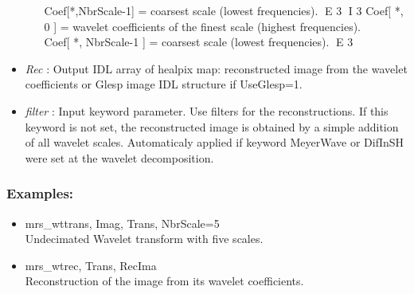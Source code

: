 \begin{itemize}
\begin{itemize}
\begin{center}
Coef[*,NbrScale-1] = coarsest scale (lowest frequencies). 
E 3
I 3
Coef[ *, 0 ] = wavelet coefficients of the finest scale (highest frequencies).\\
Coef[ *, NbrScale-1 ] = coarsest scale (lowest frequencies). 
E 3
\end{center} 
\end{itemize}
\item {\em Rec} : Output IDL array of healpix map: reconstructed image from the wavelet coefficients or Glesp image IDL structure if UseGlesp=1. 
\item {\em filter} : Input keyword parameter. Use filters for the reconstructions. If this keyword is not set, the reconstructed image is obtained 
by a simple addition of all wavelet scales. Automaticaly applied if keyword MeyerWave or DifInSH were set at the wavelet decomposition.
\end{itemize}

\subsubsection*{Examples:} 
\begin{itemize}
\item mrs\_wttrans, Imag, Trans, NbrScale=5 \\
Undecimated Wavelet transform with five scales.
\item mrs\_wtrec, Trans, RecIma \\
Reconstruction of the image from its wavelet coefficients.
\end{itemize}



